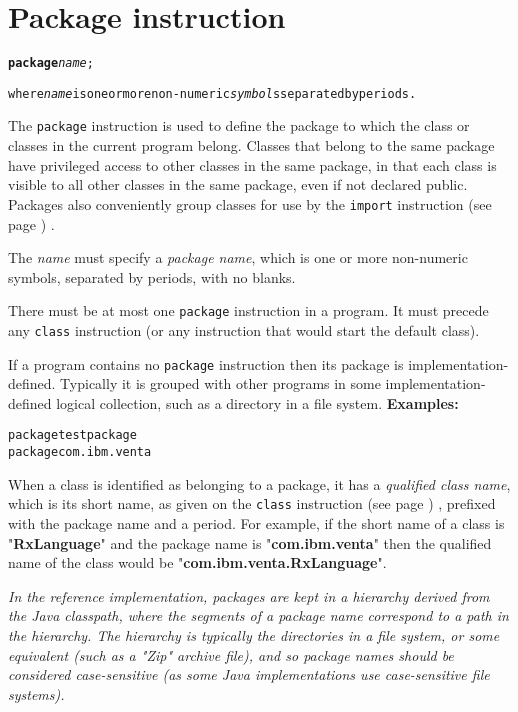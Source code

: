 \chapter{Package instruction}\label{"id"}
\begin{shaded}
\begin{alltt}
\textbf{package} \emph{name};

where \emph{name} is one or more non-numeric \emph{symbol}s separated by periods.
\end{alltt}
\end{shaded}
 
The \texttt{package} instruction is used to define the package to which
the class or classes in the current program belong.
 Classes that belong to the same package have privileged access to
other classes in the same package, in that each class is visible to all
other classes in the same package, even if not declared public.
Packages also conveniently group classes for use by the
 \texttt{import} instruction (see page \pageref{refimport}) .
 
The \emph{name} must specify a \emph{package name}, which is one
or more non-numeric symbols, separated by periods, with no
blanks.
 
There must be at most one \texttt{package} instruction in a program.
It must precede any \texttt{class} instruction (or any instruction that
would start the default class).
 
If a program contains no \texttt{package} instruction then its package
is implementation-defined.  Typically it is grouped with other programs
in some implementation-defined logical collection, such as a directory
in a file system.
 \textbf{Examples:}
\begin{alltt}
package testpackage
package com.ibm.venta
\end{alltt}
 
When a class is identified as belonging to a package, it has a
\emph{qualified class name}, which is its short name, as given on the
 \texttt{class} instruction (see page \pageref{refclass}) , prefixed with the package
name and a period.
For example, if the short name of a class is
"\textbf{RxLanguage}" and the package name is
"\textbf{com.ibm.venta}" then the qualified name of the class
would be "\textbf{com.ibm.venta.RxLanguage}".
 
\emph{In the reference implementation, packages are kept in a hierarchy
derived from the Java classpath, where the segments of a package name
correspond to a path in the hierarchy.
The hierarchy is typically the directories in a file system, or some
equivalent (such as a "Zip" archive file), and so package names
should be considered case-sensitive (as some Java implementations use
case-sensitive file systems).
}
